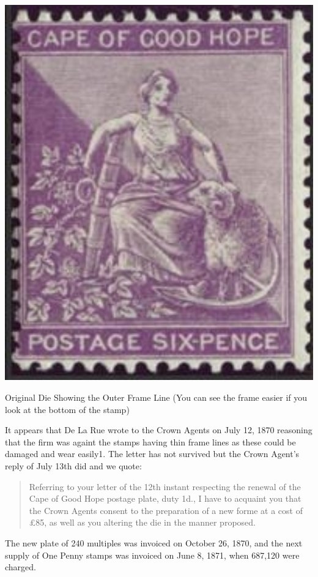\begin{marginfigure}
\includegraphics[width=1.0\textwidth]{../cape-of-good-hope/clip_image002_0001.jpg}
\caption{
Original Die Showing the Outer Frame Line (You can see the frame easier 
if you look at the bottom of the stamp)
}
\end{marginfigure}

It appears that De La Rue wrote to the Crown Agents on July 12, 1870 
reasoning that the firm was againt the stamps having thin frame lines
as these could be damaged and wear easily1. The letter has not survived but
the Crown Agent's reply of July 13th did and we quote:

\begin{quotation}
Referring to your letter of the 12th instant respecting the renewal
of the Cape of Good Hope postage plate, duty 1d., I have to acquaint
you that the Crown Agents consent to the preparation of a new forme
at a cost of \pounds85, as well as you altering the die in the
manner proposed.
\end{quotation}

The new plate of 240 multiples was invoiced on October 26, 1870, and the next
supply of One Penny stamps was invoiced on June 8, 1871, when 687,120 were charged.


